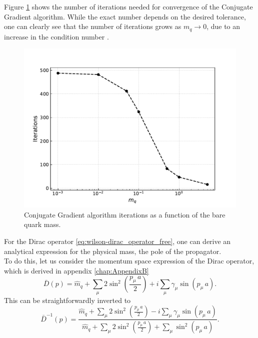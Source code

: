 Figure \ref{fig:correlator_CGiter} shows the number of iterations needed for convergence of the Conjugate Gradient algorithm. While the exact number depends on the desired tolerance, one can clearly see that the number of iterations grows as $m_q \to 0$, due to an increase in the condition number \cite{cond_num_ref}. \\
\begin{figure}[h!]
    \centering 
    \includegraphics[scale=0.6]{figures/correlator/CGiter.pdf}
    \caption[Conjugate Gradient algorithm iterations as a function of the bare quark mass.]{Conjugate Gradient algorithm iterations as a function of the bare quark mass.}
    \label{fig:correlator_CGiter}
\end{figure} 
\newpage
For the Dirac operator \ref{eq:wilson-dirac_operator_free}, one can derive an analytical expression for the physical mass, the pole of the propagator. \\
To do this, let us consider the momentum space expression of the Dirac operator, which is derived in appendix \ref{chap:AppendixB}
\begin{equation*}
\bar{D}(p)= \hat{m}_q + \sum_\mu 2 \sin ^2\left(\frac{p_\mu \, a}{2}\right)+i \sum_\mu \gamma_\mu \sin \left(p_\mu \, a\right).
\end{equation*}
This can be straightforwardly inverted to
\begin{equation*}
    \bar{D}^{-1}(p) = \frac{\hat{m}_q + \sum_\mu 2 \sin ^2\left(\frac{p_\mu \, a}{2}\right) - i \sum_\mu \gamma_\mu \sin \left(p_\mu \, a\right)}{\hat{m}_q + \sum_\mu 2 \sin^2\left(\frac{p_\mu \, a}{2}\right) + \sum_\mu \sin^2 \left(p_\mu \, a\right)}.
\end{equation*}
